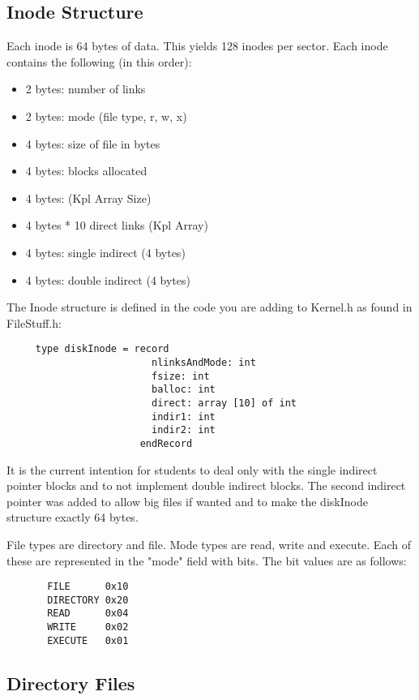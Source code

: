 \documentclass[12pt]{article}
\begin{document}
\subsection{Inode Structure}

Each inode is 64 bytes of data.  This yields 128 inodes per sector.
Each inode contains the following (in this order):
\begin{itemize}
 \item 2 bytes:  number of links
 \item 2 bytes:  mode (file type, r, w, x)
 \item 4 bytes:  size of file in bytes
 \item 4 bytes:  blocks allocated
 \item 4 bytes:  (Kpl Array Size)
 \item 4 bytes * 10 direct links (Kpl Array)
 \item 4 bytes:  single indirect (4 bytes)
 \item 4 bytes:  double indirect (4 bytes)
\end{itemize}

The Inode structure is defined in the code you are adding to Kernel.h
as found in FileStuff.h:
\begin{verbatim}
     type diskInode = record
                         nlinksAndMode: int
                         fsize: int
                         balloc: int
                         direct: array [10] of int
                         indir1: int
                         indir2: int
                       endRecord
\end{verbatim}


It is the current intention for students to deal only with the single
indirect pointer blocks and to not implement double indirect blocks.
The second indirect pointer was added to allow big files if wanted and
to make the diskInode structure exactly 64 bytes.
 
File types are directory and file.  Mode types are read, write and
execute.  Each of these are represented in the "mode" field with bits.
The bit values are as follows:
 \begin{verbatim}
       FILE      0x10
       DIRECTORY 0x20
       READ      0x04
       WRITE     0x02
       EXECUTE   0x01
 \end{verbatim}

 \subsection{Directory Files}
\end{document}

